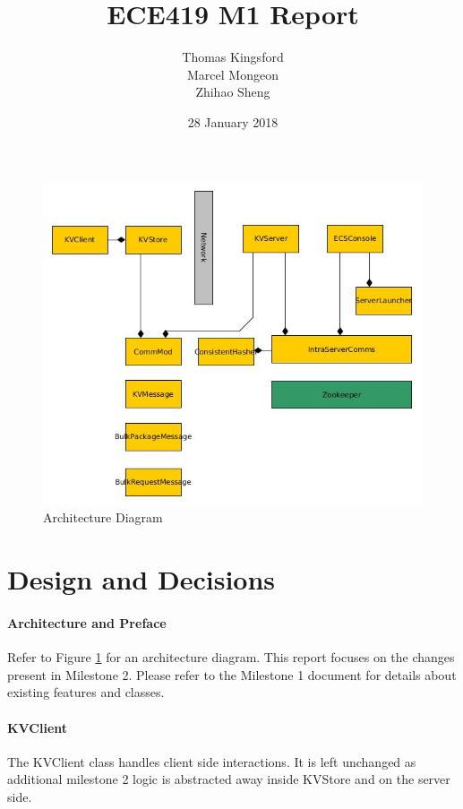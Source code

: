\documentclass[10pt]{article}
\title{ECE419 M1 Report}
\date{28 January 2018}
\author{Thomas Kingsford\\Marcel Mongeon\\Zhihao Sheng}
\begin{document}
\begin{multicols}{2}

\maketitle

\begin{figure}[H]
\centering
\includegraphics[scale=0.35]{m2_architecture}
\caption{Architecture Diagram}
\label{arch}
\end{figure}

\section{Design and Decisions}

\paragraph{Architecture and Preface} Refer to Figure \ref{arch} for an architecture diagram. This report focuses on the changes present in Milestone 2. Please refer to the Milestone 1 document for details about existing features and classes.

\paragraph{KVClient} The KVClient class handles client side interactions. It is left unchanged as additional milestone 2 logic is abstracted away inside KVStore and on the server side.


\end{multicols}
\end{document}

